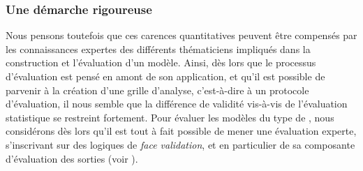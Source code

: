 \subsubsection{Une démarche rigoureuse} Nous pensons toutefois que ces carences quantitatives peuvent être compensés par les connaissances expertes des différents thématiciens impliqués dans la construction et l'évaluation d'un modèle.
Ainsi, dès lors que le processus d'évaluation est pensé en amont de son application, et qu'il est possible de parvenir à la création d'une grille d'analyse, c'est-à-dire à un protocole d'évaluation, il nous semble que la différence de \og validité\fg{} vis-à-vis de l'évaluation statistique se restreint fortement.
Pour évaluer les modèles du type de \simfeodal{}, nous considérons dès lors qu'il est tout à fait possible de mener une évaluation experte, s'inscrivant sur des logiques de \textit{face validation}, et en particulier de sa composante d'évaluation des sorties (voir ).


